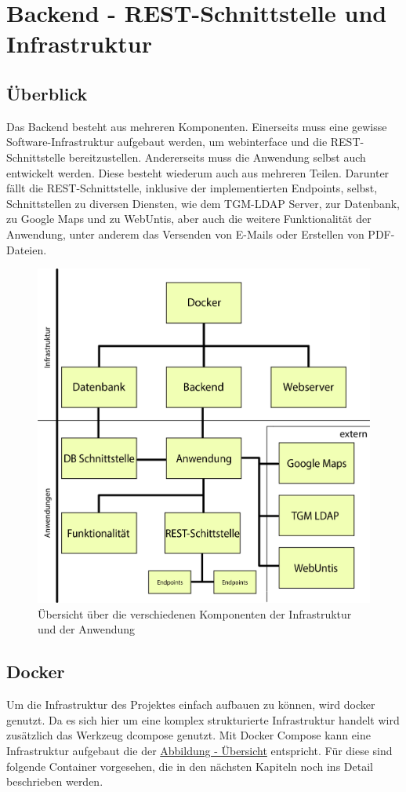 \section{Backend - REST-Schnittstelle und Infrastruktur}
	\subsection{Überblick}
	Das Backend besteht aus mehreren Komponenten. Einerseits muss eine gewisse Software-Infrastruktur aufgebaut werden, um \Gls{webinterface} und die REST-Schnittstelle bereitzustellen. Andererseits muss die Anwendung selbst auch entwickelt werden. Diese besteht wiederum auch aus mehreren Teilen. Darunter fällt die REST-Schnittstelle, inklusive der implementierten Endpoints, selbst, Schnittstellen zu diversen Diensten, wie dem TGM-LDAP Server, zur Datenbank, zu Google Maps und zu WebUntis, aber auch die weitere Funktionalität der Anwendung, unter anderem das Versenden von E-Mails oder Erstellen von PDF-Dateien.
	\\
	\begin{figure}[H]
		\centering
		\includegraphics[width=0.8\linewidth]{images/uebersicht}
		\caption[Übersicht über die Komponenten]{Übersicht über die verschiedenen Komponenten der Infrastruktur und der Anwendung}
		\label{fig:uebersicht}
	\end{figure}
	
	\subsection{Docker}
	Um die Infrastruktur des Projektes einfach aufbauen zu können, wird \Gls{docker} genutzt. Da es sich hier um eine komplex strukturierte Infrastruktur handelt wird zusätzlich das Werkzeug \Gls{dcompose} genutzt. Mit Docker Compose kann eine Infrastruktur aufgebaut die der \hyperref[fig:uebersicht]{Abbildung - Übersicht} entspricht. Für diese sind folgende Container vorgesehen, die in den nächsten Kapiteln noch ins Detail beschrieben werden.
